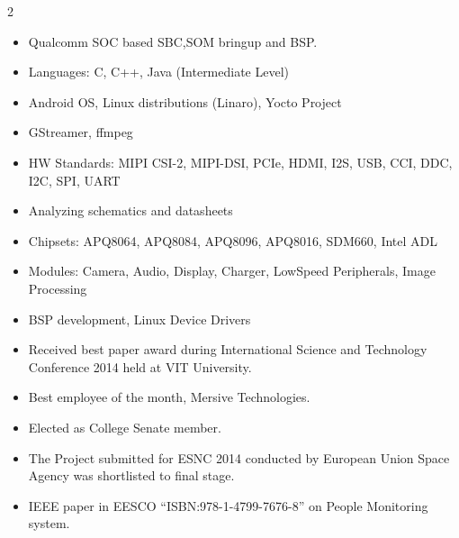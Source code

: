 \documentclass[10pt,a4paper,ragged2e,withhyper]{altacv}
\begin{document}
\begin{paracol}{2}
\divider

\begin{itemize}
    \item Qualcomm SOC based SBC,SOM bringup and BSP.
\end{itemize}

\switchcolumn

\begin{itemize}
    \item Languages: C, C++, Java (Intermediate Level)
    \item Android OS, Linux distributions (Linaro), Yocto Project
    \item GStreamer, ffmpeg
    \item HW Standards: MIPI CSI-2, MIPI-DSI, PCIe, HDMI, I2S, USB, CCI, DDC, I2C, SPI, UART
    \item Analyzing schematics and datasheets
    \item Chipsets: APQ8064, APQ8084, APQ8096, APQ8016, SDM660, Intel ADL
    \item Modules: Camera, Audio, Display, Charger, LowSpeed Peripherals, Image Processing
    \item BSP development, Linux Device Drivers
\end{itemize}



\divider


\begin{itemize}
    \item Received best paper award during International Science and Technology Conference 2014 held at VIT University.
    \item Best employee of the month, Mersive Technologies.
    \item Elected as College Senate member.
    \item The Project submitted for ESNC 2014 conducted by European Union Space Agency was shortlisted to final stage.
    \item IEEE paper in EESCO “ISBN:978-1-4799-7676-8” on People Monitoring system.
\end{itemize}


\end{paracol}
\end{document}
